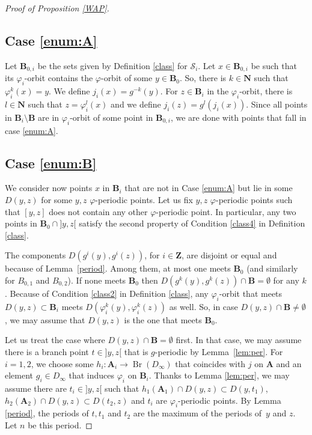 \documentclass[JEP,XML,SOM,Unicode,NoFloatCountersInSection]{cedram}
\let\mathcal\mathscr
\theoremstyle{plain}
\theoremstyle{definition}
\newcommand{\bA}{{\boldsymbol{A}}}
\newcommand{\bB}{{\boldsymbol{B}}}
\newcommand{\NN}{\mathbf{N}}
\newcommand{\ZZ}{\mathbf{Z}}
\newcommand{\cS}{\mathcal{S}}
\DeclareMathOperator{\Br}{Br}
\begin{document}
\begin{proof}[Proof of Proposition \ref{WAP}]
\subsection*{Case \ref{enum:A}} Let $\bB_{0,i}$ be the sets given by Definition \ref{class} for $\cS_i$. Let $x\in\bB_{0,i}$ be such that its $\varphi_i$-orbit contains the $\varphi$-orbit of some $y\in\bB_0$. So, there is $k\in\NN$ such that $\varphi_i^k(x)=y$. We define $j_i(x)=g^{-k}(y)$. For $z\in\bB_i$ in the $\varphi_i$-orbit, there is $l\in\NN$ such that $z=\varphi_i^l(x)$ and we define $j_i(z)=g^l(j_i(x))$. Since all points in $\bB_i\setminus\bB$ are in $\varphi_i$-orbit of some point in $\bB_{0,i}$, we are done with points that fall in case \eqref{enum:A}.

\subsection*{Case \ref{enum:B}} We consider now points $x$ in $\bB_i$ that are not in Case \ref{enum:A} but lie in some $D(y,z)$ for some $y,z$ $\varphi$-periodic points. Let us fix $y,z$ $\varphi$-periodic points such that $[y,z]$ does not contain any other $\varphi$-periodic point. In particular, any two points in $\bB_0\cap{}]y,z[$ satisfy the second property of Condition \eqref{class4} in Definition \ref{class}.

The components $D(g^i(y),g^i(z))$, for $i\in\ZZ$, are disjoint or equal and because of Lemma~\ref{period}. Among them, at most one meets $\bB_0$ (and similarly for $B_{0,1}$ and $B_{0,2}$). If none meets $\bB_0$ then $D(g^k(y),g^k(z))\cap\bB=\emptyset$ for any $k$. Because of Condition \eqref{class2} in Definition \ref{class}, any $\varphi_i$-orbit that meets $D(y,z)\subset \bB_i$ meets $D(\varphi^k_i(y),\varphi^k_i(z))$ as well. So, in case $D(y,z)\cap\bB\neq\emptyset$, we may assume that $D(y,z)$ is the one that meets $\bB_0$. 

Let us treat the case where $D(y,z)\cap\bB=\emptyset$ first. In that case, we may assume there is a branch point $t\in{}]y,z[$ that is $g$-periodic by Lemma~\ref{lem:per}. For $i=1,2$, we choose some $h_i\colon \bA_i\to\Br(D_\infty)$ that coincides with $j$ on $\bA$ and an element $g_i\in D_\infty$ that induces $\varphi_i$ on $\bB_i$. Thanks to Lemma \ref{lem:per}, we may assume there are $t_i\in{}]y,z[$ such that $h_1(\bA_1)\cap D(y,z)\subset D(y,t_1)$, $h_2(\bA_2)\cap D(y,z)\subset D(t_2,z)$ and $t_i$ are $\varphi_i$-periodic points. By Lemma \ref{period}, the periods of $t,t_1$ and $t_2$ are the maximum of the periods of~$y$ and $z$. Let $n$ be this period.


\end{proof}
\end{document}

